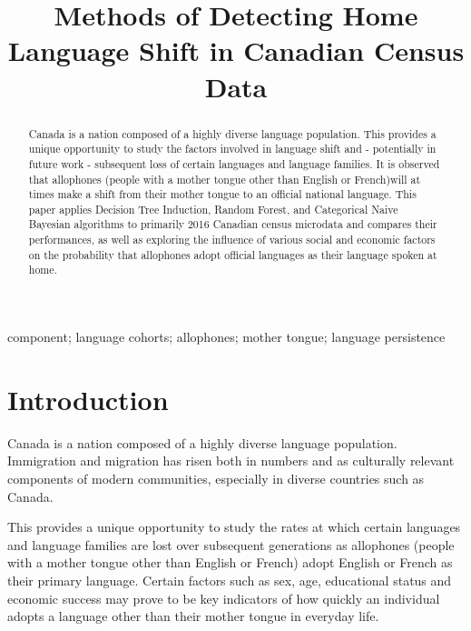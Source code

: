 \documentclass[10pt, conference, compsocconf]{IEEEtran}
\begin{document}
\title{Methods of Detecting Home Language Shift in Canadian Census Data}

\author{
}

\maketitle


\begin{abstract}
Canada is a nation composed of a highly diverse language population. This provides a unique opportunity to study the factors involved in language shift and - potentially in future work - subsequent loss of certain languages and language families. It is observed that allophones (people with a mother tongue other than English or French)will at times make a shift from their mother tongue to an official national language. This paper applies Decision Tree Induction, Random Forest, and Categorical Naive Bayesian algorithms to primarily 2016 Canadian census microdata and compares their performances, as well as exploring the influence of various social and economic factors on the probability that allophones adopt official languages as their language spoken at home.

\end{abstract}

\begin{IEEEkeywords}
component; language cohorts; allophones; mother tongue; language persistence

\end{IEEEkeywords}


\IEEEpeerreviewmaketitle



\section{Introduction}
Canada is a nation composed of a highly diverse language population. Immigration and migration has risen both in numbers and as culturally relevant components of modern communities, especially in diverse countries such as Canada.

This provides a unique opportunity to study the rates at which certain languages and language families are lost over subsequent generations as allophones (people with a mother tongue other than English or French) adopt English or French as their primary language. Certain factors such as sex, age, educational status and economic success may prove to be key indicators of how quickly an individual adopts a language other than their mother tongue in everyday life.
\end{document}

